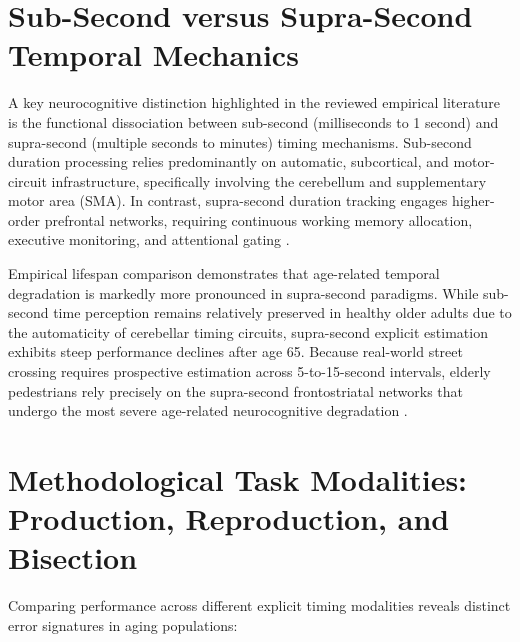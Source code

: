 \documentclass{custom_report}
\begin{document}
\section{Sub-Second versus Supra-Second Temporal Mechanics}
A key neurocognitive distinction highlighted in the reviewed empirical literature is the functional dissociation between sub-second (milliseconds to 1 second) and supra-second (multiple seconds to minutes) timing mechanisms. Sub-second duration processing relies predominantly on automatic, subcortical, and motor-circuit infrastructure, specifically involving the cerebellum and supplementary motor area (SMA). In contrast, supra-second duration tracking engages higher-order prefrontal networks, requiring continuous working memory allocation, executive monitoring, and attentional gating \cite{Capizzi2022}.

Empirical lifespan comparison demonstrates that age-related temporal degradation is markedly more pronounced in supra-second paradigms. While sub-second time perception remains relatively preserved in healthy older adults due to the automaticity of cerebellar timing circuits, supra-second explicit estimation exhibits steep performance declines after age 65. Because real-world street crossing requires prospective estimation across 5-to-15-second intervals, elderly pedestrians rely precisely on the supra-second frontostriatal networks that undergo the most severe age-related neurocognitive degradation \cite{Carrigan2026, Zivotofsky2012}.

\section{Methodological Task Modalities: Production, Reproduction, and Bisection}
Comparing performance across different explicit timing modalities reveals distinct error signatures in aging populations:
\end{document}
